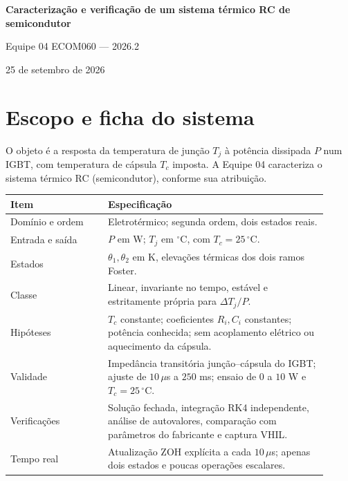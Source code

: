 \documentclass[11pt,a4paper]{article}
\begin{document}
\begin{center}
{\large\bfseries Caracterização e verificação de um sistema térmico RC de semicondutor\par}
\medskip
Equipe 04 \quad ECOM060 --- 2026.2\par
25 de setembro de 2026
\end{center}
\vspace{.4cm}
\begin{abstract}
Este relatório caracteriza o sistema 6 do Banco de Sistemas: a dinâmica térmica
junção--cápsula de um semicondutor. Os quatro ramos Foster publicados para o
IGBT IKD04N60RF são reduzidos a dois estados para uma implementação discreta
em TyphoonSim/Virtual HIL. São documentados proveniência, dimensões,
hipóteses, polos, métricas de resposta, erro de redução e verificações
independentes. A implementação foi compilada no Typhoon HIL Control Center
2026.2 e executada em Virtual HIL. Uma captura real de 30.000 amostras,
com passo de 10~$\mu$s, foi comparada com a solução analítica; o erro
máximo observado foi $1{,}908\times10^{-6}$~K. A concordância verifica
a implementação numérica, sem constituir validação física independente
do dispositivo.
\end{abstract}

\section{Escopo e ficha do sistema}
O objeto é a resposta da temperatura de junção $T_j$ à potência dissipada
$P$ num IGBT, com temperatura de cápsula $T_c$ imposta. A Equipe 04
caracteriza o sistema térmico RC (semicondutor), conforme sua atribuição.

\begin{center}
\begin{tabular}{p{0.28\linewidth}p{0.63\linewidth}}
\toprule
Item & Especificação \\
\midrule
Domínio e ordem & Eletrotérmico; segunda ordem, dois estados reais.\\
Entrada e saída & $P$ em W; $T_j$ em $^\circ$C, com $T_c=25\,^\circ$C.\\
Estados & $\theta_1,\theta_2$ em K, elevações térmicas dos dois ramos Foster.\\
Classe & Linear, invariante no tempo, estável e estritamente própria para $\Delta T_j/P$.\\
Hipóteses & $T_c$ constante; coeficientes $R_i,C_i$ constantes; potência conhecida; sem acoplamento elétrico ou aquecimento da cápsula.\\
Validade & Impedância transitória junção--cápsula do IGBT; ajuste de $10\,\mu$s a $250$ ms; ensaio de $0$ a $10$ W e $T_c=25\,^\circ$C.\\
Verificações & Solução fechada, integração RK4 independente, análise de autovalores, comparação com parâmetros do fabricante e captura VHIL.\\
Tempo real & Atualização ZOH explícita a cada $10\,\mu$s; apenas dois estados e poucas operações escalares.\\
\bottomrule
\end{tabular}
\end{center}
\end{document}
